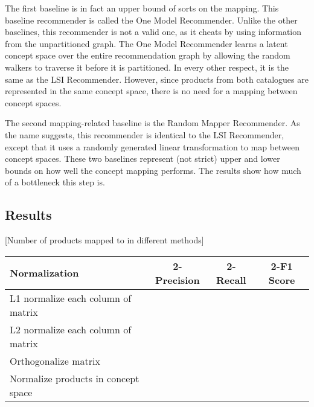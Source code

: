 \documentclass[11pt]{article}
\begin{document}
The first baseline is in fact an upper bound of sorts on the mapping. This
baseline recommender is called the One Model Recommender. Unlike the other
baselines, this recommender is not a valid one, as it cheats by using
information from the unpartitioned graph. The One Model Recommender learns a
latent concept space over the entire recommendation graph by allowing the random
walkers to traverse it before it is partitioned. In every other respect, it is
the same as the LSI Recommender. However, since products from both catalogues
are represented in the same concept space, there is no need for a mapping
between concept spaces.

The second mapping-related baseline is the Random Mapper Recommender. As the
name suggests, this recommender is identical to the LSI Recommender, except that
it uses a randomly generated linear transformation to map between concept
spaces. These two baselines represent (not strict) upper and lower bounds on how
well the concept mapping performs. The results show how much of a bottleneck
this step is.

\subsection*{Results}
[Number of products mapped to in different methods]
\begin{center}
\begin{tabular}{ | l | c | c | c |}
\hline
Normalization & 2-Precision & 2-Recall & 2-F1 Score \\ \hline\hline
L1 normalize each column of matrix &&&\\ \hline
L2 normalize each column of matrix &&&\\ \hline
Orthogonalize matrix &&&\\ \hline
Normalize products in concept space &&&\\ \hline
\end{tabular}
\end{center}
\end{document}
